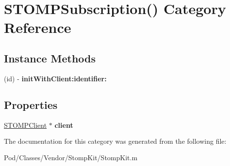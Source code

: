 \hypertarget{category_s_t_o_m_p_subscription_07_08}{}\section{S\+T\+O\+M\+P\+Subscription() Category Reference}
\label{category_s_t_o_m_p_subscription_07_08}
\subsection*{Instance Methods}
\begin{DoxyCompactItemize}
\item 
(id) -\/ {\bfseries init\+With\+Client\+:identifier\+:}\hypertarget{category_s_t_o_m_p_subscription_07_08_a7c4a4535b03e1edd7b43b6846f337c1a}{}\label{category_s_t_o_m_p_subscription_07_08_a7c4a4535b03e1edd7b43b6846f337c1a}

\end{DoxyCompactItemize}
\subsection*{Properties}
\begin{DoxyCompactItemize}
\item 
\hyperlink{interface_s_t_o_m_p_client}{S\+T\+O\+M\+P\+Client} $\ast$ {\bfseries client}\hypertarget{category_s_t_o_m_p_subscription_07_08_a7457ae72dd7c7fd5f08ae303c256a68b}{}\label{category_s_t_o_m_p_subscription_07_08_a7457ae72dd7c7fd5f08ae303c256a68b}

\end{DoxyCompactItemize}


The documentation for this category was generated from the following file\+:\begin{DoxyCompactItemize}
\item 
Pod/\+Classes/\+Vendor/\+Stomp\+Kit/Stomp\+Kit.\+m\end{DoxyCompactItemize}
